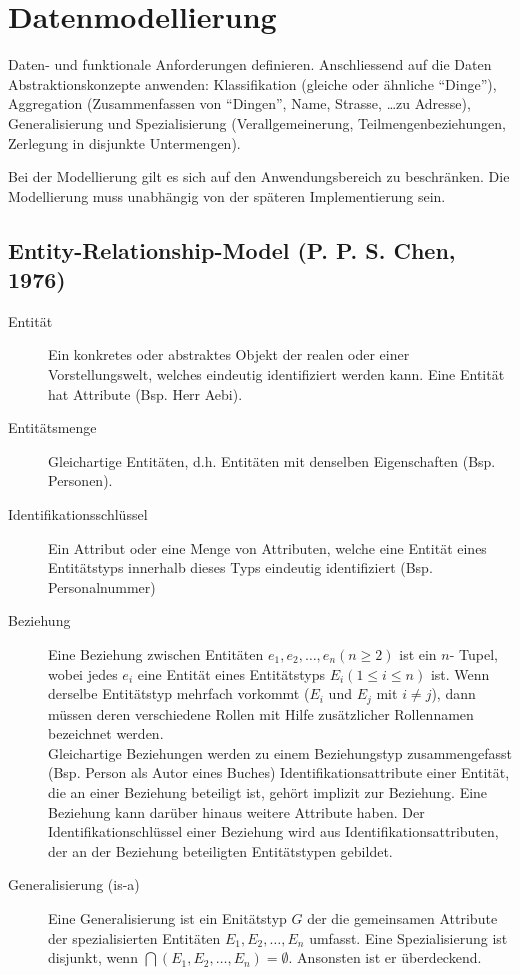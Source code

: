 \section{Datenmodellierung}
Daten- und funktionale Anforderungen definieren. Anschliessend auf die Daten Abstraktionskonzepte anwenden:
Klassifikation (gleiche oder ähnliche \enquote{Dinge}), Aggregation (Zusammenfassen von \enquote{Dingen}, Name, Strasse, \dots zu Adresse),
Generalisierung und Spezialisierung (Verallgemeinerung, Teilmengenbeziehungen, Zerlegung in disjunkte Untermengen).

Bei der Modellierung gilt es sich auf den Anwendungsbereich zu beschränken. Die Modellierung muss unabhängig von der 
späteren Implementierung sein.

\subsection{Entity-Relationship-Model (P. P. S. Chen, 1976)}
\begin{description}
	\item [Entität] Ein  konkretes  oder  abstraktes  Objekt  der  realen  oder  einer  
Vorstellungswelt, welches eindeutig identifiziert werden kann. Eine Entität hat Attribute (Bsp. Herr Aebi). 
	\item [Entitätsmenge] Gleichartige Entitäten, d.h. Entitäten mit denselben Eigenschaften (Bsp. Personen).
	\item [Identifikationsschlüssel] Ein Attribut oder eine Menge von Attributen, welche eine Entität eines
Entitätstyps innerhalb dieses Typs eindeutig identifiziert (Bsp. Personalnummer)
	\item [Beziehung] Eine Beziehung zwischen Entitäten $e_1, e_2, \dots, e_n (n \geq 2)$ ist ein $n$-
Tupel, wobei jedes $e_i$ eine Entität eines Entitätstyps $E_i (1 \leq i \leq n)$ ist. Wenn derselbe Entitätstyp mehrfach 
vorkommt ($E_i$ und $E_j$ mit $i \neq j$), dann müssen deren verschiedene Rollen mit Hilfe zusätzlicher
Rollennamen bezeichnet werden.\\
	Gleichartige Beziehungen werden zu einem Beziehungstyp zusammengefasst (Bsp. Person als Autor eines Buches)
	Identifikationsattribute einer Entität, die an einer Beziehung beteiligt ist, gehört implizit zur Beziehung.
	Eine Beziehung kann darüber hinaus weitere Attribute haben. Der Identifikationschlüssel einer Beziehung wird
	aus Identifikationsattributen, der an der Beziehung beteiligten Entitätstypen gebildet.
	\item[Generalisierung (is-a)] Eine Generalisierung ist ein Enitätstyp $G$ der die gemeinsamen Attribute der
	spezialisierten Entitäten $E_1, E_2, \dots, E_n$ umfasst.
	Eine Spezialisierung ist disjunkt, wenn $\bigcap (E_1, E_2, \dots, E_n) = \emptyset$. Ansonsten ist er überdeckend.
\end{description}

